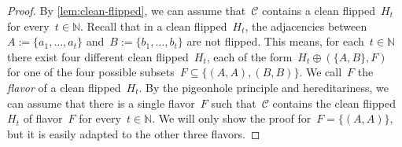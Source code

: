 \documentclass[11pt]{article}      \usepackage[margin=1in]{geometry}  \usepackage{microtype}
\theoremstyle{definition}
\newcommand{\N}[0]{\mathrm{\mathbb{N}}}
\newcommand{\CC}{\mathcal{C}}
\begin{document}
\begin{proof}
    By \cref{lem:clean-flipped}, we can assume that~$\CC$ contains a clean flipped~$H_t$ for every~$t \in \N$.
    Recall that in a clean flipped~$H_t$, the adjacencies between~$A := \{a_1,\ldots,a_t\}$ and~$B := \{b_1,\ldots,b_t\}$ are not flipped.
    This means, for each~$t\in\N$ there exist four different clean flipped~$H_t$, each of the form~$H_t \oplus (\{A,B\},F)$ for one of the four possible subsets~$F \subseteq \{(A,A),(B,B)\}$.
    We call~$F$ the \emph{flavor} of a clean flipped~$H_t$.
    By the pigeonhole principle and hereditariness, we can assume that there is a single flavor~$F$ such that~$\CC$ contains the clean flipped~$H_t$ of flavor~$F$ for every~$t\in\N$.
    We will only show the proof for~$F = \{(A,A)\}$, but it is easily adapted to the other three flavors.


\end{proof}
\end{document}
